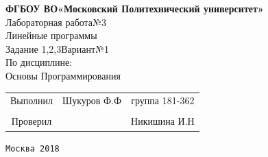 \documentclass[a4paper]{article}
\begin{document}
\begin{center}
\hfill \break
\large{\textbf{ФГБОУ ВО«Московский Политехнический университет»}}\\
\hfill \break
\hfill \break
\hfill \break
\hfill \break
\hfill \break
\hfill \break
\hfill \break
\large{Лабораторная работа№3}\\
\footnotesize{Линейные программы\\
Задание 1,2,3\hspace{3cm}Вариант№1\break\\
По дисциплине:\\
Основы Программирования
}
\end{center}
\hfill \break
\hfill \break
\hfill \break
\hfill \break
\hfill \break
\hfill \break
\hfill \break
\hfill \break
\hfill \break
\hfill \break
\normalsize{
\begin{tabular}{ccc}
\hspace{4cm}Выполнил & Шукуров Ф.Ф  & группа 181-362\\
\\
\hspace{4cm}Проверил & \underline{\hspace{3cm}}& Никишина И.Н
\end{tabular}
}
\hfill \break
\hfill \break
\hfill \break
\hfill \break
\hfill \break
\hfill \break
\hfill \break
\hfill \break
\hfill \break
\hfill \break
\hfill \break
\hfill \break
\hfill \break
\hfill \break
\hfill \break
\begin{center}\texttt{Москва 2018}\end{center}
\thispagestyle{empty}
\end{document}
